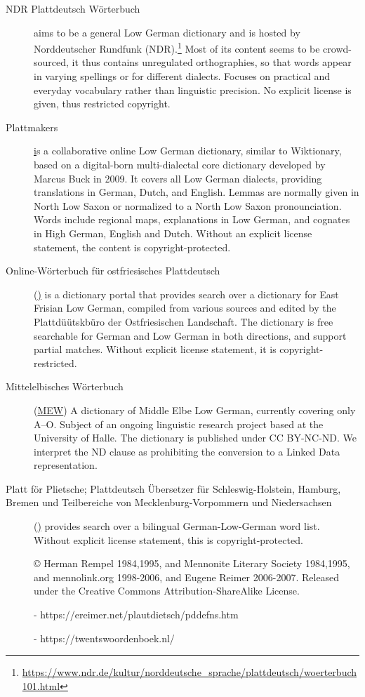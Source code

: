 \documentclass{article}
\begin{document}
\begin{description}
\item[NDR Plattdeutsch Wörterbuch] aims to be a general Low German dictionary and is hosted by Norddeutscher Rundfunk (NDR).\footnote{\url{https://www.ndr.de/kultur/norddeutsche_sprache/plattdeutsch/woerterbuch101.html}} Most of its content seems to be crowd-sourced, it thus contains unregulated orthographies, so that words appear in varying spellings or for different dialects. Focuses on practical and everyday vocabulary rather than linguistic precision. No explicit license is given, thus restricted copyright.

\item[Plattmakers] \href{https://plattmakers.de} is a collaborative online Low German dictionary, similar to Wiktionary, based on a digital-born multi-dialectal core dictionary developed by Marcus Buck in 2009. It covers all Low German dialects, providing translations in German, Dutch, and English. Lemmas are normally given in North Low Saxon or normalized to a North Low Saxon pronounciation. Words include regional maps, explanations in Low German, and cognates in High German, English and Dutch. Without an explicit license statement, the content is copyright-protected.

\item[Online-Wörterbuch für ostfriesisches Plattdeutsch] (\href{https://www.platt-wb.de/}) 
    is a dictionary portal that provides search over a dictionary for East Frisian Low German, compiled from various sources and edited by the Plattdüütskbüro der Ostfriesischen Landschaft. The dictionary is free searchable for German and Low German in both directions, and support partial matches. Without explicit license statement, it is copyright-restricted.

\item[Mittelelbisches Wörterbuch] (\href{https://mew.uzi.uni-halle.de/artikel/25748}{MEW})
    A dictionary of Middle Elbe Low German, currently covering only A–O. Subject of an ongoing linguistic research project based at the University of Halle.  The dictionary is published under CC BY-NC-ND. We interpret the ND clause as prohibiting the conversion to a Linked Data representation.

\item[Platt för Plietsche; Plattdeutsch Übersetzer für Schleswig-Holstein, Hamburg, Bremen und Teilbereiche von Mecklenburg-Vorpommern und Niedersachsen] (\href{https://www.plattdeutsches-woerterbuch.de/}) provides search over a bilingual German-Low-German word list. Without explicit license statement, this is copyright-protected.


© Herman Rempel 1984,1995, and Mennonite Literary Society 1984,1995, and mennolink.org 1998-2006, and Eugene Reimer 2006-2007.  Released under the Creative Commons Attribution-ShareAlike License.

- https://ereimer.net/plautdietsch/pddefns.htm


- https://twentswoordenboek.nl/

\end{description}
\end{document}
